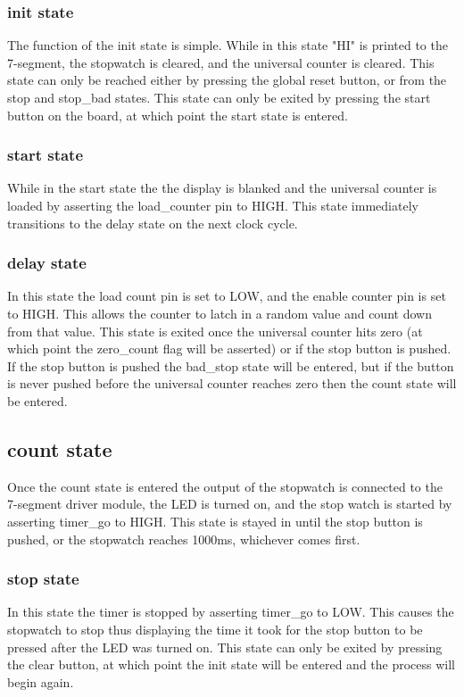 \documentclass[11pt]{article}
\begin{document}
\subsubsection{init state}
The function of the init state is simple. While in this state "HI" is printed to the 7-segment, the stopwatch is cleared, and the universal counter is cleared. This state can only be reached either by pressing the global reset button, or from the stop and stop\_bad states. This state can only be exited by pressing the start button on the board, at which point the start state is entered.

\subsubsection{start state}
While in the start state the the display is blanked and the universal counter is loaded by asserting the load\_counter pin to HIGH. This state immediately transitions to the delay state on the next clock cycle.

\subsubsection{delay state}
In this state the load count pin is set to LOW, and the enable counter pin is set to HIGH. This allows the counter to latch in a random value and count down from that value. This state is exited once the universal counter hits zero (at which point the zero\_count flag will be asserted) or if the stop button is pushed. If the stop button is pushed the bad\_stop state will be entered, but if the button is never pushed before the universal counter reaches zero then the count state will be entered.

\subsection{count state}
Once the count state is entered the output of the stopwatch is connected to the 7-segment driver module, the LED is turned on, and the stop watch is started by asserting timer\_go to HIGH. This state is stayed in until the stop button is pushed, or the stopwatch reaches 1000ms, whichever comes first.

\subsubsection{stop state}
In this state the timer is stopped by asserting timer\_go to LOW. This causes the stopwatch to stop thus displaying the time it took for the stop button to be pressed after the LED was turned on. This state can only be exited by pressing the clear button, at which point the init state will be entered and the process will begin again.
\end{document}
